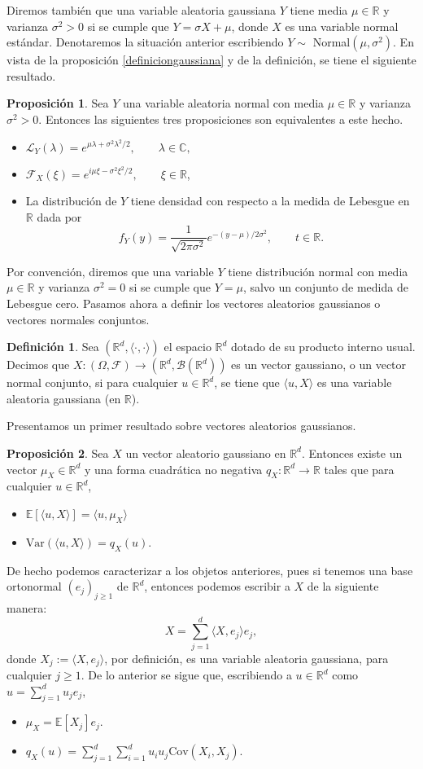 \documentclass[letterpaper,twoside,12pt]{book}
\newcommand{\R}{\mathbb{R}}
\newcommand{\C}{\mathbb{C}}
\newcommand{\F}{\mathcal{F}}
\newcommand{\B}{\mathcal{B}}
\newcommand{\E}{\mathbb{E}}
\newcommand{\1}{\mathds{1}}
\renewcommand{\to}{\rightarrow}
\theoremstyle{definition}
\newtheorem{dfn}{Definición}
\theoremstyle{definition}
\theoremstyle{remark}
\theoremstyle{definition}
\theoremstyle{definition}
\newtheorem{prop}{Proposición}
\theoremstyle{definition}
\theoremstyle{definition}
\theoremstyle{definition}
\begin{document}
Diremos también que una variable aleatoria gaussiana $Y$ tiene media $\mu\in \R$ y varianza $\sigma^2>0$ si se cumple que $Y=\sigma X+\mu$, donde $X$ es una variable normal estándar. Denotaremos la situación anterior escribiendo $Y\sim$ Normal$(\mu,\sigma^2)$. En vista de la proposición \ref{definiciongaussiana} y de la definición, se tiene el siguiente resultado.
\begin{prop} 
 Sea $Y$ una variable aleatoria normal con media $\mu\in \R$ y varianza $\sigma^2>0$. Entonces las siguientes tres proposiciones son equivalentes a este hecho.
 \begin{itemize}
    \item $\mathcal{L}_Y(\lambda)=e^{\mu\lambda+\sigma^2\lambda^2/2}, \qquad \lambda \in \C,$
    \item $\F_X(\xi)=e^{i\mu\xi-\sigma^2\xi^2/2}, \qquad \xi \in \R$,
    \item La distribución de $Y$ tiene densidad con respecto a la medida de Lebesgue en $\R$ dada por 
    \[
        f_Y(y)=\frac{1}{\sqrt{2\pi\sigma^2}}e^{-(y-\mu)/2\sigma^2}, \qquad t\in \R.    
    \]
 \end{itemize}
 \end{prop}
 Por convención, diremos que una variable $Y$ tiene distribución normal con media $\mu\in \R$ y varianza $\sigma^2=0$ si se cumple que $Y=\mu$, salvo un conjunto de medida de Lebesgue cero. Pasamos ahora a definir los vectores aleatorios gaussianos o vectores normales conjuntos. 
 \begin{dfn} 
  Sea $(\R^d, \langle\cdot,\cdot\rangle)$ el espacio $\R^{d}$ dotado de su producto interno usual. Decimos que $X:(\Omega,\F)\to (\R^{d},\B(\R^d))$ es un vector gaussiano, o un vector normal conjunto, si para cualquier $u\in \R^d$, se tiene que $\langle u,X\rangle$ es una variable aleatoria gaussiana (en $\R$).
  \end{dfn}
Presentamos un primer resultado sobre vectores aleatorios gaussianos.
\begin{prop} 
Sea $X$ un vector aleatorio gaussiano en $\R^{d}$. Entonces existe un vector $\mu_X\in\R^d$ y una forma cuadrática no negativa $q_X:\R^d\to \R$ tales que para cualquier $u\in \R^d$,
\begin{itemize}
    \item $\E\left[\langle u,X\rangle\right]=\langle u,\mu_X\rangle$
    \item $\text{Var}\left(\langle u,X\rangle\right)=q_X(u)$.
\end{itemize}
De hecho podemos caracterizar a los objetos anteriores, pues si tenemos una base ortonormal $(e_{j})_{j\geq1}$ de $\R^{d}$, entonces podemos escribir a $X$ de la siguiente manera:
\[
X=\sum_{j=1}^{d}\langle X,e_j\rangle e_j,  
\]
donde $X_j:=\langle X,e_j\rangle$, por definición, es una variable aleatoria gaussiana, para cualquier $j\geq1$. De lo anterior se sigue que, escribiendo a $u\in \R^d$ como $u=\sum_{j=1}^{d}u_je_j$, 
\begin{itemize}
    \item $\mu_X=\E\left[X_j\right]e_j$.
    \item $q_X(u)=\sum_{j=1}^{d}\sum_{i=1}^{d}u_iu_j \text{Cov}\left(X_i,X_j\right)$.
\end{itemize}
 \end{prop}
\end{document}
